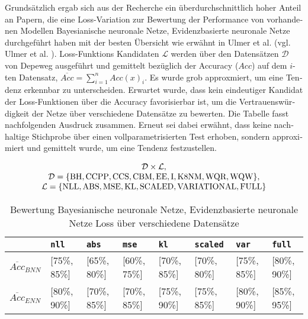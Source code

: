 \begin{otherlanguage}{ngerman}
Grundsätzlich ergab sich aus der Recherche ein überdurchschnittlich hoher Anteil an Papern, die eine Loss-Variation zur Bewertung der Performance von vorhandenen Modellen \gls{Bayesianische neuronale Netze}, \gls{Evidenzbasierte neuronale Netze} durchgeführt haben mit der besten Übersicht wie erwähnt in Ulmer et al. (vgl. Ulmer et al. \parencite{Ulmer2023}). Loss-Funktions Kandidaten $\mathcal{L}$ werden über den Datensätzen $\mathcal{D}$ von Depeweg ausgeführt und gemittelt bezüglich der Accuracy ($Acc$) auf dem $i$-ten Datensatz, $\overline{Acc} = \sum_{i=1}^{n} Acc(x)_{i}$. Es wurde grob approxmiert, um eine Tendenz erkennbar zu unterscheiden. Erwartet wurde, dass kein eindeutiger Kandidat der Loss-Funktionen über die Accuracy favorisierbar ist, um die Vertrauenswürdigkeit der Netze über verschiedene Datensätze zu bewerten. Die Tabelle fasst nachfolgenden Ausdruck zusammen. Erneut sei dabei erwähnt, dass keine nachhaltige Stichprobe über einen vollparametrisierten Test erhoben, sondern approximiert und gemittelt wurde, um eine Tendenz festzustellen. 

\[
\begin{array}{c}
\mathcal{D} \times \mathcal{L}, \\
\vspace{0.15\baselineskip}
\noindent
\mathcal{D} = \{\text{BH}, \text{CCPP}, \text{CCS}, \text{CBM}, \text{EE}, \text{I}, \text{K8NM}, \text{WQR}, \text{WQW} \}, \\
\vspace{0.15\baselineskip}
\noindent
\mathcal{L} = \{\text{NLL}, \text{ABS}, \text{MSE}, \text{KL}, \text{SCALED}, \text{VARIATIONAL}, \text{FULL} \}
\end{array}
\]

\begin{table}[htbp]
\scriptsize
\renewcommand{\arraystretch}{1.5}
\begin{tabularx}{\textwidth}{|l|l|l|l|l|l|l|l|}
\hline
 & \texttt{nll} & \texttt{abs} & \texttt{mse} & \texttt{kl} & \texttt{scaled} & \texttt{var} & \texttt{full} \\
\hline
$\overline{Acc}_{BNN}$ & [75\%, 85\%] & [65\%, 80\%] & [60\%, 75\%] & [70\%, 85\%] & [70\%, 80\%] & [75\%, 85\%] & [80\%, 90\%] \\
\hline
$\overline{Acc}_{ENN}$ & [80\%, 90\%] & [70\%, 85\%] & [70\%, 85\%] & [75\%, 90\%] & [75\%, 85\%] & [80\%, 90\%] & [85\%, 95\%] \\
\hline
\end{tabularx}
\caption{Bewertung \gls{Bayesianische neuronale Netze}, \gls{Evidenzbasierte neuronale Netze} Loss über verschiedene Datensätze}
\end{table}


\end{otherlanguage}
